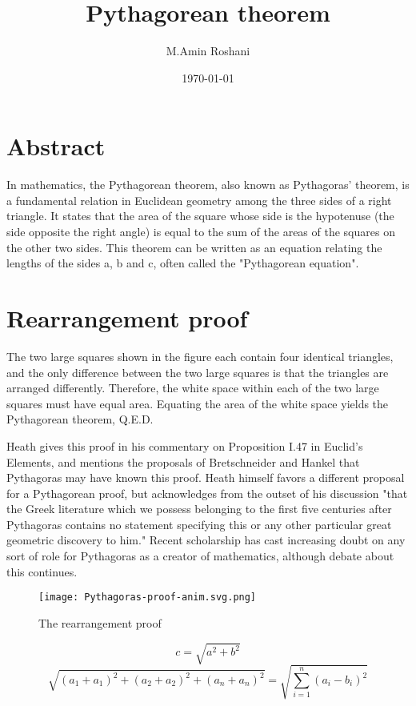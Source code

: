 \documentclass[]{hdsr}
\begin{document}
\begin{center}

\title{Pythagorean theorem}
\author{M.Amin Roshani}
\date{\today}
\maketitle

\end{center}
\tableofcontents
\newpage




\begin{center}

\end{center}


\section*{Abstract}
In mathematics, the Pythagorean theorem, also known as Pythagoras' theorem, is a fundamental relation in Euclidean geometry among the three sides of a right triangle. It states that the area of the square whose side is the hypotenuse (the side opposite the right angle) is equal to the sum of the areas of the squares on the other two sides. This theorem can be written as an equation relating the lengths of the sides a, b and c, often called the "Pythagorean equation".

\section{Rearrangement proof}
\label{sec1}
The two large squares shown in the figure each contain four identical triangles, and the only difference between the two large squares is that the triangles are arranged differently. Therefore, the white space within each of the two large squares must have equal area. Equating the area of the white space yields the Pythagorean theorem, Q.E.D.\cite{3}

Heath gives this proof in his commentary on Proposition I.47 in Euclid's Elements, and mentions the proposals of Bretschneider and Hankel that Pythagoras may have known this proof. Heath himself favors a different proposal for a Pythagorean proof, but acknowledges from the outset of his discussion "that the Greek literature which we possess belonging to the first five centuries after Pythagoras contains no statement specifying this or any other particular great geometric discovery to him." Recent scholarship has cast increasing doubt on any sort of role for Pythagoras as a creator of mathematics, although debate about this continues.
\begin{figure}[H]
    \centering
    \texttt{[image: Pythagoras-proof-anim.svg.png]} \\
    \caption{The rearrangement proof}
    \label{fig:my_label}
\end{figure}
\begin{equation}
    c = \sqrt{a^2 + b^2}
\end{equation}
\begin{equation}
    \sqrt{(a_1 + a_1)^2 + (a_2 + a_2)^2 + (a_n + a_n)^2} = \sqrt{\sum_{i=1}^{n} (a_i - b_i)^2}
\end{equation}
\end{document}
